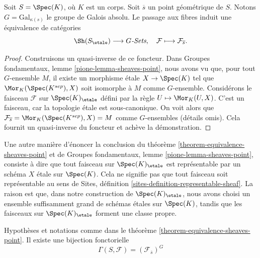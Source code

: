 \begin{theorem}
\label{theorem-equivalence-sheaves-point}
Soit $S = \Spec(K)$, o\`u $K$ est un corps.
Soit $\overline{s}$ un point g\'eom\'etrique de $S$.
Notons $G = \text{Gal}_{\kappa(s)}$ le groupe de Galois absolu.
Le passage aux fibres induit une \'equivalence de cat\'egories
$$
\Sh(S_\etale) \longrightarrow G\textit{-Sets},
\quad
\mathcal{F} \longmapsto \mathcal{F}_{\overline{s}}.
$$
\end{theorem}

\begin{proof}
Construisons un quasi-inverse de ce foncteur. Dans
Groupes fondamentaux, lemme \ref{pione-lemma-sheaves-point},
nous avons vu que, pour tout $G$-ensemble $M$, il existe un morphisme \'etale
$X \to \Spec(K)$
tel que $\Mor_K(\Spec(K^{sep}), X)$ soit
isomorphe \`a $M$ comme $G$-ensemble. Consid\'erons le faisceau
$\mathcal{F}$ sur $\Spec(K)_\etale$ d\'efini par
la r\`egle $U \mapsto \Mor_K(U, X)$. C'est un faisceau, car la topologie
\'etale est sous-canonique. On voit alors que
$\mathcal{F}_{\overline{s}} = \Mor_K(\Spec(K^{sep}), X) = M$
comme $G$-ensembles (d\'etails omis). Cela fournit un quasi-inverse du foncteur et
ach\`eve la d\'emonstration.
\end{proof}

\begin{remark}
\label{remark-every-sheaf-representable}
Une autre mani\`ere d'\'enoncer la conclusion du
th\'eor\`eme \ref{theorem-equivalence-sheaves-point} et de
Groupes fondamentaux, lemme \ref{pione-lemma-sheaves-point},
consiste \`a dire que tout faisceau sur $\Spec(K)_\etale$ est repr\'esentable
par un sch\'ema $X$ \'etale sur $\Spec(K)$.
Cela ne signifie pas que tout faisceau soit repr\'esentable au sens de
Sites, d\'efinition \ref{sites-definition-representable-sheaf}.
La raison est que, dans notre construction de $\Spec(K)_\etale$,
nous avons choisi un ensemble suffisamment grand de sch\'emas \'etales sur $\Spec(K)$,
tandis que les faisceaux sur $\Spec(K)_\etale$ forment une classe propre.
\end{remark}

\begin{lemma}
\label{lemma-global-sections-point}
Hypoth\`eses et notations comme dans le
th\'eor\`eme \ref{theorem-equivalence-sheaves-point}.
Il existe une bijection fonctorielle
$$
\Gamma(S, \mathcal{F}) = (\mathcal{F}_{\overline{s}})^G
$$
\end{lemma}

